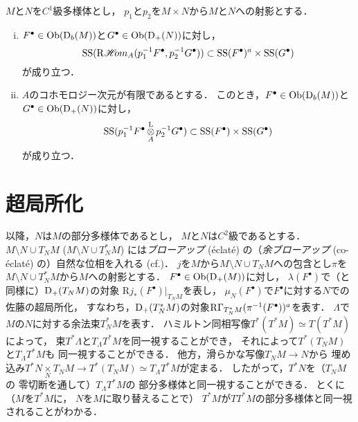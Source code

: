 \begin{PRP}
    \(M\)と\(N\)を\(C^1\)級多様体とし，
    \(p_1\)と\(p_2\)を\(M\times N\)から\(M\)と\(N\)への射影とする．
    \begin{enumerate}[(i)]
        \item \(F^\bullet\in\mathop{\textrm{Ob}}\nolimits({\mathrm{D}}_b(M))\)と\(G^\bullet\in\mathop{\textrm{Ob}}\nolimits({\mathrm{D}}_+(N))\)に対し，\[
            \mathop{\mathrm{SS}}\nolimits(\mathop{\mathrm{R}\hspace{-1.5pt}\mathop{\mathscr{H}\hspace{-2pt}om}\nolimits}\nolimits_A(p_1^{-1}F^\bullet,p_2^{-1}G^\bullet))\subset\mathop{\mathrm{SS}}\nolimits(F^\bullet)^a\times\mathop{\mathrm{SS}}\nolimits(G^\bullet)
        \]が成り立つ．
        \item \(A\)のコホモロジー次元が有限であるとする．
        このとき，\(F^\bullet\in\mathop{\textrm{Ob}}\nolimits({\mathrm{D}}_b(M))\)と\(G^\bullet\in\mathop{\textrm{Ob}}\nolimits({\mathrm{D}}_+(N))\)に対し，\[
            \mathop{\mathrm{SS}}\nolimits(p_1^{-1}F^\bullet\mathop{\otimes}\limits^\mathrm{L}_A p_2^{-1}G^\bullet)\subset\mathop{\mathrm{SS}}\nolimits(F^\bullet)\times\mathop{\mathrm{SS}}\nolimits(G^\bullet)
        \]が成り立つ．  
    \end{enumerate}
\end{PRP}

\section{超局所化}

以降，\(N\)は\(M\)の部分多様体であるとし，
\(M\)と\(N\)は\(C^2\)級であるとする．
\(M\setminus N \cup T_NM\) (\(M\setminus N \cup T^\ast_NM\)) 
には\emph{ブローアップ} (\'eclat\'e) の（\emph{余ブローアップ} 
(co-\'eclat\'e) の）自然な位相を入れる (cf.\cite{SKK})．
\(j\)を\(M\)から\(M\setminus N \cup T_NM\)への包含とし\(\pi\)を
\(M\setminus N \cup T^\ast_NM\)から\(M\)への射影とする．
\(F^\bullet\in\mathop{\textrm{Ob}}\nolimits({\mathrm{D}}_+(M))\)に対し，
\(\lambda(F^\bullet)\)で（\cite{Mal}と同様に）\({\mathrm{D}}_+(T_NM)\)の対象
\(\mathrm{R}j_\ast(F^\bullet)\rvert_{T_NM}\)を表し，
\(\mu_N(F^\bullet)\)で\(F^\bullet\)に対する\(N\)での佐藤の超局所化，
すなわち，\({\mathrm{D}}_+(T^\ast_NM)\)の対象\(\mathop{\mathrm{R}\hspace{-0pt}\Gamma}\nolimits_{T^\ast_NM}(\pi^{-1}(F^\bullet))^a\)を表す．
\(\Lambda\)で\(M\)の\(N\)に対する余法束\(T_N^\ast M\)を表す．
ハミルトン同相写像\(T^\ast(T^\ast M)\simeq T(T^\ast M)\)によって，
束\(T^\ast\Lambda\)と\(T_\Lambda T^\ast M\)を同一視することができ，
それによって\(T^\ast(T_N M)\)と\(T_\Lambda T^\ast M\)も
同一視することができる．
他方，滑らかな写像\(T_N M\to N\)から
埋め込み\(T^\ast N\mathop{\times}\limits_{N}T_N M
\to T^\ast(T_N M)\simeq T_\Lambda T^\ast M\)が定まる．
したがって，\(T^\ast{N}\)を（\(T_{N}M\)の
零切断を通して）\(T_{\Lambda}T^{\ast}M\)の
部分多様体と同一視することができる．
とくに（\(M\)を\(T^\ast M\)に，
\(N\)を\(M\)に取り替えることで）
\(T^\ast M\)が\(TT^\ast M\)の部分多様体と同一視されることがわかる．

